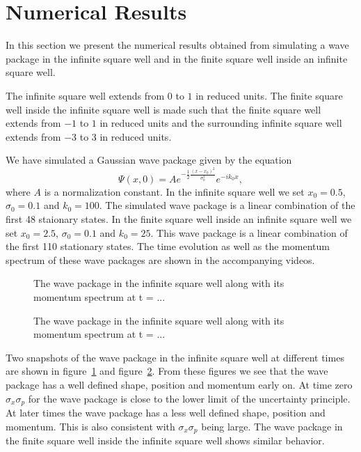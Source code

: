 \documentclass[12pt,a4paper]{article}
\begin{document}
\section{Numerical Results}
In this section we present the numerical results obtained from simulating a wave package in the infinite square well and in the finite square well inside an infinite square well.

The infinite square well extends from $0$ to $1$ in reduced units. The finite square well inside the infinite square well is made such that the finite square well extends from $-1$ to $1$ in reduced units and the surrounding infinite square well extends from $-3$ to $3$ in reduced units.

We have simulated a Gaussian wave package given by the equation
\begin{equation}
\Psi(x, 0) = A e^{- \frac{1}{2} \frac{(x - x_0)^2}{\sigma_0^2}} e^{- i k_0 x},
\end{equation}
where $A$ is a normalization constant. In the infinite square well we set $x_0 = 0.5$, $\sigma_0 = 0.1$ and $k_0 = 100$. The simulated wave package is a linear combination of the first 48 staionary states. In the finite square well inside an infinite square well we set $x_0 = 2.5$, $\sigma_0 = 0.1$ and $k_0 = 25$. This wave package is a linear combination of the first 110 stationary states. The time evolution as well as the momentum spectrum of these wave packages are shown in the accompanying videos.

\begin{figure}
\caption{The wave package in the infinite square well along with its momentum spectrum at t = ...} \label{fig:wavePackageInit}
\end{figure}

\begin{figure}
\caption{The wave package in the infinite square well along with its momentum spectrum at t = ...} \label{fig:wavePackageLater}
\end{figure}

Two snapshots of the wave package in the infinite square well at different times are shown in figure~\ref{fig:wavePackageInit} and figure~\ref{fig:wavePackageLater}. From these figures we see that the wave package has a  well defined shape, position and momentum early on. At time zero $\sigma_x \sigma_p$ for the wave package is close to the lower limit of the uncertainty principle. At later times the wave package has a less well defined shape, position and momentum. This is also consistent with $\sigma_x \sigma_p$ being large. The wave package in the finite square well inside the infinite square well shows similar behavior.
\end{document}
